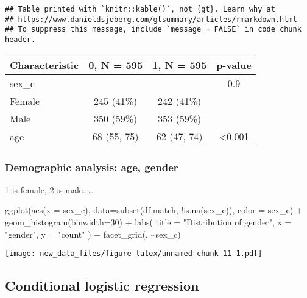 \documentclass[
]{article}
\newenvironment{Shaded}{\begin{snugshade}}{\end{snugshade}}
\newcommand{\AttributeTok}[1]{\textcolor[rgb]{0.77,0.63,0.00}{#1}}
\newcommand{\DecValTok}[1]{\textcolor[rgb]{0.00,0.00,0.81}{#1}}
\newcommand{\FunctionTok}[1]{\textcolor[rgb]{0.00,0.00,0.00}{#1}}
\newcommand{\NormalTok}[1]{#1}
\newcommand{\SpecialCharTok}[1]{\textcolor[rgb]{0.00,0.00,0.00}{#1}}
\newcommand{\StringTok}[1]{\textcolor[rgb]{0.31,0.60,0.02}{#1}}
\begin{document}
\begin{verbatim}
## Table printed with `knitr::kable()`, not {gt}. Learn why at
## https://www.danieldsjoberg.com/gtsummary/articles/rmarkdown.html
## To suppress this message, include `message = FALSE` in code chunk header.
\end{verbatim}

\begin{longtable}[]{@{}lccc@{}}
\toprule()
\textbf{Characteristic} & \textbf{0}, N = 595 & \textbf{1}, N = 595 &
\textbf{p-value} \\
\midrule()
\endhead
sex\_c & & & 0.9 \\
Female & 245 (41\%) & 242 (41\%) & \\
Male & 350 (59\%) & 353 (59\%) & \\
age & 68 (55, 75) & 62 (47, 74) & \textless0.001 \\
\bottomrule()
\end{longtable}

\hypertarget{demographic-analysis-age-gender}{%
\subsubsection{Demographic analysis: age,
gender}\label{demographic-analysis-age-gender}}

1 is female, 2 is male. \ldots{}

\begin{Shaded}
\begin{Highlighting}[]
\FunctionTok{ggplot}\NormalTok{(}\FunctionTok{aes}\NormalTok{(}\AttributeTok{x =}\NormalTok{ sex\_c), }\AttributeTok{data=}\FunctionTok{subset}\NormalTok{(df.match, }\SpecialCharTok{!}\FunctionTok{is.na}\NormalTok{(sex\_c)), }\AttributeTok{color =}\NormalTok{ sex\_c) }\SpecialCharTok{+}
  \FunctionTok{geom\_histogram}\NormalTok{(}\AttributeTok{binwidth=}\DecValTok{30}\NormalTok{) }\SpecialCharTok{+} \FunctionTok{labs}\NormalTok{(}
    \AttributeTok{title =} \StringTok{"Distribution of gender"}\NormalTok{,}
    \AttributeTok{x =} \StringTok{"gender"}\NormalTok{,}
    \AttributeTok{y =} \StringTok{"count"}
\NormalTok{  ) }\SpecialCharTok{+}
  \FunctionTok{facet\_grid}\NormalTok{(. }\SpecialCharTok{\textasciitilde{}}\NormalTok{sex\_c) }
\end{Highlighting}
\end{Shaded}

\texttt{[image: new\_data\_files/figure-latex/unnamed-chunk-11-1.pdf]}

\hypertarget{conditional-logistic-regression}{%
\subsection{Conditional logistic
regression}\label{conditional-logistic-regression}}
\end{document}
